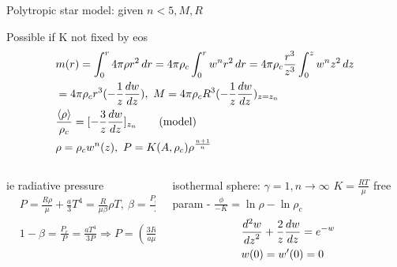 \begin{frame}{Polytropic star model: given $n<5, M, R$}
\begin{block}{Possible if K not fixed by eos}
\begin{align*}
&m(r)=\int_0^r4\pi\rho r^2\,dr=4\pi\rho_c\int_0^rw^nr^2\,dr=4\pi\rho_c\frac{r^3}{z^3}\int_0^zw^nz^2\,dz\\
&=4\pi\rho_cr^3(-\frac{1}{z}\TDy{z}{w}),\ M=4\pi\rho_cR^3(-\frac{1}{z}\TDy{z}{w})_{z=z_n}\\
&\frac{\exv{\rho}}{\rho_c}=[-\frac{3}{z}\TDy{z}{w}]_{z_n}\tag{model}\\
&\rho=\rho_cw^n(z),\ P=K(A,\rho_c)\rho^{\frac{n+1}{n}}
\end{align*}
\end{block}
\begin{columns}[T]
\begin{column}{0.55\textwidth}
\begin{block}{ie radiative pressure}
	\begin{align*}
	&P=\frac{R\rho}{\mu}+\frac{a}{3}T^4=\frac{R}{\mu\beta}\rho T,\ \beta=\frac{P_{gas}}{P}\\
	&1-\beta=\frac{P_r}{P}=\frac{aT^4}{3P}\Rightarrow P=(\frac{3R^4}{a\mu^4})^{\frac{1}{3}}(\frac{1-\beta}{\beta^4})^{\frac{1}{3}}\rho^{\frac{4}{3}}
	\end{align*}
\end{block}
\end{column}
\begin{column}{0.45\textwidth}
\begin{block}{isothermal sphere: $\gamma=1, n\to\infty$}
$K=\frac{RT}{\mu}$ free param - $\frac{\phi}{-K}=\ln{\rho}-\ln{\rho_c}$
\begin{align*}
&\TtwoDy{z}{w}+\frac{2}{z}\TDy{z}{w}=\exp{-w}\\
&w(0)=w'(0)=0
\end{align*}
\end{block}
\end{column}
\end{columns}
\end{frame}

